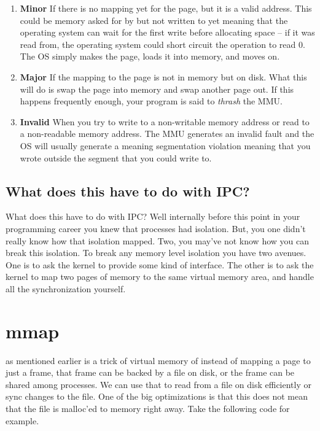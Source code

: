 \begin{enumerate}
\item \textbf{Minor} If there is no mapping yet for the page, but it is a valid address.
  This could be memory asked for by  but not written to yet meaning that the operating system can wait for the first write before allocating space -- if it was read from, the operating system could short circuit the operation to read 0.
  The OS simply makes the page, loads it into memory, and moves on.

\item \textbf{Major} If the mapping to the page is not in memory but on disk.
  What this will do is swap the page into memory and swap another page out.
  If this happens frequently enough, your program is said to \emph{thrash} the MMU.

\item \textbf{Invalid} When you try to write to a non-writable memory address or read to a non-readable memory address.
  The MMU generates an invalid fault and the OS will usually generate a  meaning segmentation violation meaning that you wrote outside the segment that you could write to.

\end{enumerate}

\subsection{What does this have to do with IPC?}

What does this have to do with IPC?
Well internally before this point in your programming career you knew that processes had isolation.
But, you one didn't really know how that isolation mapped.
Two, you may've not know how you can break this isolation.
To break any memory level isolation you have two avenues.
One is to ask the kernel to provide some kind of interface.
The other is to ask the kernel to map two pages of memory to the same virtual memory area, and handle all the synchronization yourself.

\section{mmap}

 as mentioned earlier is a trick of virtual memory of instead of mapping a page to just a frame, that frame can be backed by a file on disk, or the frame can be shared among processes.
We can use that to read from a file on disk efficiently or sync changes to the file.
One of the big optimizations is that this does not mean that the file is malloc'ed to memory right away.
Take the following code for example.

